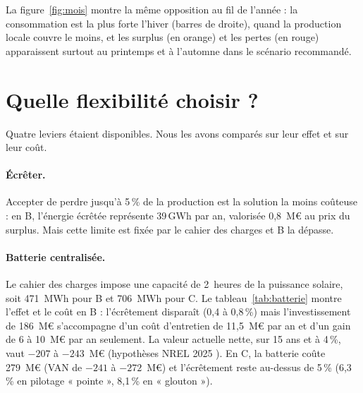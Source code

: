 \documentclass[11pt, a4paper]{report}
\newcommand{\pct}{\,\%}
\newcommand{\gwh}{\,GWh}
\begin{document}

La figure~\ref{fig:mois} montre la même opposition au fil de l'année : la consommation est la plus forte l'hiver (barres de droite), quand la production locale couvre le moins, et les surplus (en orange) et les pertes (en rouge) apparaissent surtout au printemps et à l'automne dans le scénario recommandé.


\section{Quelle flexibilité choisir ?}

Quatre leviers étaient disponibles. Nous les avons comparés sur leur effet et sur leur coût.

\paragraph{Écrêter.} Accepter de perdre jusqu'à 5\pct{} de la production est la solution la moins coûteuse : en B, l'énergie écrêtée représente 39\gwh{} par an, valorisée 0,8~M\euro{} au prix du surplus. Mais cette limite est fixée par le cahier des charges et B la dépasse.

\paragraph{Batterie centralisée.} Le cahier des charges impose une capacité de 2~heures de la puissance solaire, soit 471~MWh pour B et 706~MWh pour C. Le tableau~\ref{tab:batterie} montre l'effet et le coût en B : l'écrêtement disparaît (0,4 à 0,8\pct) mais l'investissement de 186~M\euro{} s'accompagne d'un coût d'entretien de 11,5~M\euro{} par an et d'un gain de 6 à 10~M\euro{} par an seulement. La valeur actuelle nette, sur 15 ans et à 4\pct, vaut $-207$ à $-243$~M\euro{} (hypothèses NREL 2025 \cite{nrel_storage}). En C, la batterie coûte 279~M\euro{} (VAN de $-241$ à $-272$~M\euro) et l'écrêtement reste au-dessus de 5\pct{} (6,3\pct{} en pilotage « pointe », 8,1\pct{} en « glouton »).
\end{document}
